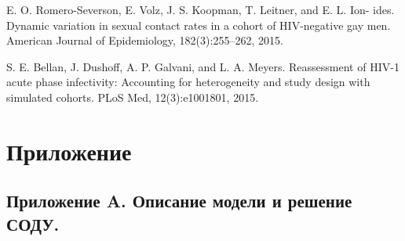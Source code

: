 \documentclass[a4paper]{report}
\begin{document}
\begin{thebibliography}{99}
		E. O. Romero-Severson, E. Volz, J. S. Koopman, T. Leitner, and E. L. Ion- ides. Dynamic variation in sexual contact rates in a cohort of HIV-negative gay men. American Journal of Epidemiology, 182(3):255–262, 2015.
		
		S. E. Bellan, J. Dushoff, A. P. Galvani, and L. A. Meyers. Reassessment of HIV-1 acute phase infectivity: Accounting for heterogeneity and study design with simulated cohorts. PLoS Med, 12(3):e1001801, 2015.
		
		

	\end{thebibliography}



\chapter*{Приложение}

\section*{Приложение A. Описание модели и решение СОДУ.}


\lstset{language=Python}
\lstset{frame=lines}
\lstset{basicstyle=\ttfamily}
\end{document}
